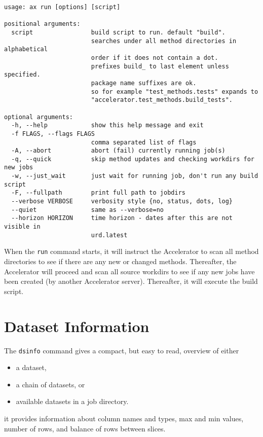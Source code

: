 \begin{snugshade}
\begin{verbatim}
usage: ax run [options] [script]

positional arguments:
  script                build script to run. default "build".
                        searches under all method directories in alphabetical
                        order if it does not contain a dot.
                        prefixes build_ to last element unless specified.
                        package name suffixes are ok.
                        so for example "test_methods.tests" expands to
                        "accelerator.test_methods.build_tests".

optional arguments:
  -h, --help            show this help message and exit
  -f FLAGS, --flags FLAGS
                        comma separated list of flags
  -A, --abort           abort (fail) currently running job(s)
  -q, --quick           skip method updates and checking workdirs for new jobs
  -w, --just_wait       just wait for running job, don't run any build script
  -F, --fullpath        print full path to jobdirs
  --verbose VERBOSE     verbosity style {no, status, dots, log}
  --quiet               same as --verbose=no
  --horizon HORIZON     time horizon - dates after this are not visible in
                        urd.latest
\end{verbatim}
\end{snugshade}
When the \texttt{run} command starts, it will instruct the Accelerator
to scan all method directories to see if there are any new or changed
methods.  Thereafter, the Accelerator will proceed and scan all source
workdirs to see if any new jobs have been created (by another
Accelerator server).  Thereafter, it will execute the build script.




\section{Dataset Information}
The \texttt{dsinfo} command gives a compact, but easy to read,
overview of either
\begin{itemize}
\item[] a dataset,
\item[] a chain of datasets, or
\item[] available datasets in a job directory.
\end{itemize}
it provides information about column names and types, max and min
values, number of rows, and balance of rows between slices.

